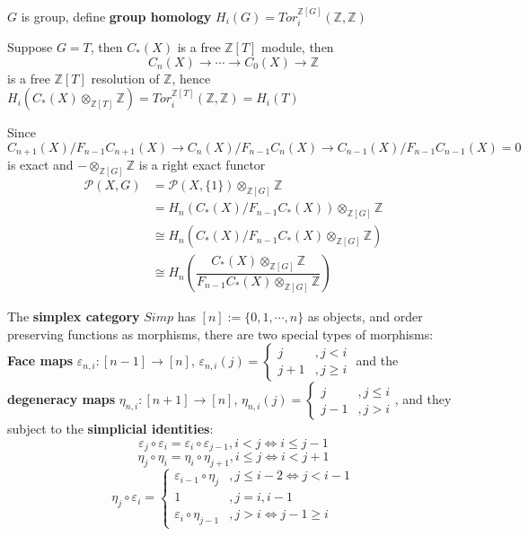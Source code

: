 \documentclass[../main.tex]{subfiles}
\begin{document}
\begin{definition}
$G$ is group, define \textbf{group homology} $H_i(G)=Tor_i^{\mathbb Z[G]}(\mathbb Z,\mathbb Z)$
\end{definition}

\begin{example}
Suppose $G=T$, then $C_*(X)$ is a free $\mathbb Z[T]$ module, then
\[C_n(X)\to\cdots\to C_0(X)\to\mathbb Z\]
is a free $\mathbb Z[T]$ resolution of $\mathbb Z$, hence $H_i(C_*(X)\otimes_{\mathbb Z[T]}\mathbb Z)=Tor^{\mathbb Z[T]}_i(\mathbb Z,\mathbb Z)=H_i(T)$
\end{example}

\begin{definition}
Since
\[C_{n+1}(X)/F_{n-1}C_{n+1}(X)\to C_n(X)/F_{n-1}C_n(X)\to C_{n-1}(X)/F_{n-1}C_{n-1}(X)=0\]
is exact and $-\otimes_{\mathbb Z[G]}\mathbb Z$ is a right exact functor
\begin{align*}
\mathcal P(X,G)&=\mathcal P(X,\{1\})\otimes_{\mathbb Z[G]}\mathbb Z \\
&=H_n(C_*(X)/F_{n-1}C_*(X))\otimes_{\mathbb Z[G]}\mathbb Z \\
&\cong H_n\left(C_*(X)/F_{n-1}C_*(X)\otimes_{\mathbb Z[G]}\mathbb Z\right) \\
&\cong H_n\left(\dfrac{C_*(X)\otimes_{\mathbb Z[G]}\mathbb Z}{F_{n-1}C_*(X)\otimes_{\mathbb Z[G]}\mathbb Z}\right)
\end{align*}
\end{definition}

\begin{definition}
The \textbf{simplex category} $Simp$ has $[n]:=\{0,1,\cdots,n\}$ as objects, and order preserving functions as morphisms, there are two special types of morphisms: \textbf{Face maps} $\varepsilon_{n,i}:[n-1]\to [n]$, $\varepsilon_{n,i}(j)=\begin{cases}
j&,j<i \\
j+1&,j\geq i
\end{cases}$ and the \textbf{degeneracy maps} $\eta_{n,i}:[n+1]\to[n]$, $\eta_{n,i}(j)=\begin{cases}
j&,j\leq i \\
j-1&,j> i
\end{cases}$, and they subject to the \textbf{simplicial identities}:
\[\varepsilon_j\circ \varepsilon_i=\varepsilon_{i}\circ \varepsilon_{j-1},i<j\Leftrightarrow i\leq j-1\]
\[\eta_j\circ \eta_i=\eta_i\circ \eta_{j+1},i\leq j\Leftrightarrow i<j+1\]
\[\eta_j\circ \varepsilon_i=\begin{cases}
\varepsilon_{i-1}\circ \eta_j&,j\leq i-2\Leftrightarrow j<i-1 \\
1&, j=i,i-1 \\
\varepsilon_{i}\circ \eta_{j-1}&, j>i\Leftrightarrow j-1\geq i
\end{cases}\]
\end{definition}
\end{document}
